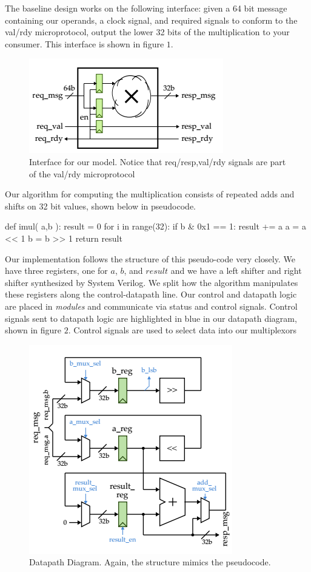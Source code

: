 \documentclass[11pt,twocolumn]{article}
\begin{document}
The baseline design works on the following interface: given a 64 bit message containing our operands, a clock signal,
and required signals to conform to the val/rdy microprotocol, output the lower 32 bits of the multiplication to your consumer.
This interface is shown in figure $1$.
\begin{figure}[b]
\centering
\includegraphics[scale=0.5]{FLmodel}
\caption{Interface for our model. Notice that req/resp,val/rdy signals are part of the val/rdy microprotocol}
\end{figure}
Our algorithm for computing the multiplication consists of repeated adds and shifts on 32 bit values, shown below in pseudocode.
\begin{python}
def imul( a,b ):
    result = 0
    for i in range(32):
        if b & 0x1 == 1:
            result += a
        a = a << 1
        b = b >> 1
    return result
\end{python}
Our implementation follows the structure of this pseudo-code very closely. We have three registers, one for $a$, $b$, and $result$ and we have 
a left shifter and right shifter synthesized by System Verilog. 
We split how the algorithm manipulates these registers along the control-datapath line. 
Our control and datapath logic are placed in \textit{modules} and communicate
via status and control signals. Control signals sent to datapath logic are highlighted in blue in our datapath diagram, shown in figure $2$. 
Control signals are used to select data into our multiplexors %
\begin{figure}[b]
\centering
\includegraphics[scale=0.6]{Datapath}
\caption{Datapath Diagram. Again, the structure mimics the pseudocode.}
\end{figure}
\end{document}
